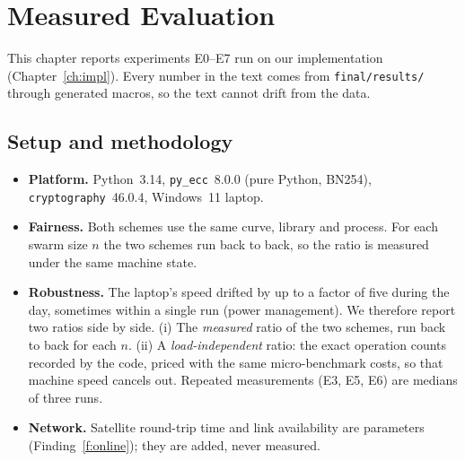 \chapter{Measured Evaluation}\label{ch:eval}
This chapter reports experiments E0--E7 run on our implementation (Chapter~\ref{ch:impl}). Every number in the text comes from \texttt{final/results/}
through generated macros, so the text cannot drift from the data.

\section{Setup and methodology}
\begin{itemize}
  \item \textbf{Platform.} Python~3.14, \texttt{py\_ecc}~8.0.0 (pure Python, BN254), \texttt{cryptography}~46.0.4, Windows~11 laptop.
  \item \textbf{Fairness.} Both schemes use the same curve, library and process. For each swarm size $n$ the two schemes run back to back, so the ratio is
        measured under the same machine state.
  \item \textbf{Robustness.} The laptop's speed drifted by up to a factor of five during the day, sometimes within a single run (power management). We
        therefore report two ratios side by side. (i) The \emph{measured} ratio of the two schemes, run back to back for each $n$. (ii) A
        \emph{load-independent} ratio: the exact operation counts recorded by the code, priced with the same micro-benchmark costs, so that machine speed
        cancels out. Repeated measurements (E3, E5, E6) are medians of three runs.
  \item \textbf{Network.} Satellite round-trip time and link availability are parameters (Finding~\ref{f:online}); they are added, never measured.
\end{itemize}

